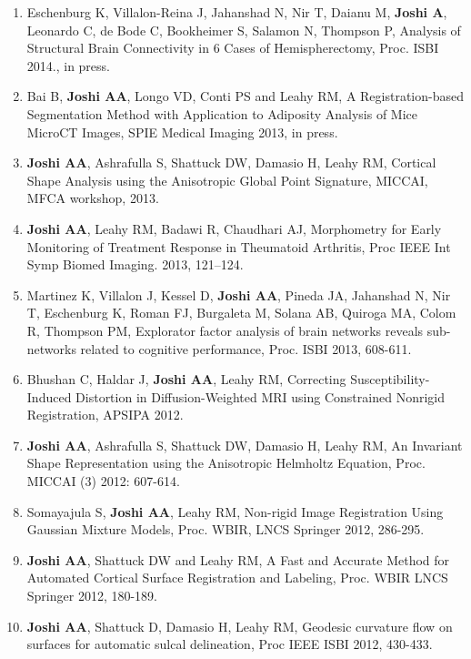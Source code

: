 \documentclass[overlapped,line,letterpaper]{res}
\begin{document}
\begin{resume}
\begin{enumerate}
    \item Eschenburg K, Villalon-Reina J, Jahanshad N, Nir T, Daianu M, \textbf{Joshi A}, Leonardo C, de Bode C, Bookheimer S, Salamon N, Thompson P, {Analysis of Structural Brain Connectivity in 6 Cases of Hemispherectomy},  Proc. ISBI 2014., in press.


    \item Bai B, \textbf{Joshi AA}, Longo VD, Conti PS and Leahy RM, {A Registration-based Segmentation Method with Application to Adiposity Analysis of Mice MicroCT Images}, SPIE Medical Imaging 2013, in press.

    \item \textbf{Joshi AA}, Ashrafulla S, Shattuck DW, Damasio H, Leahy RM, {Cortical Shape Analysis using the Anisotropic Global Point Signature}, MICCAI, MFCA workshop, 2013.
 
    \item \textbf{Joshi AA}, Leahy RM, Badawi R, Chaudhari AJ, {Morphometry for Early Monitoring of Treatment Response in Theumatoid Arthritis}, Proc IEEE Int Symp Biomed Imaging. 2013, 121–124. 

    \item Martinez K, Villalon J, Kessel D, \textbf{Joshi AA}, Pineda JA, Jahanshad N, Nir T, Eschenburg K, Roman FJ, Burgaleta M, Solana AB, Quiroga MA, Colom R, Thompson PM, {Explorator factor analysis of brain networks reveals sub-networks related to cognitive performance}, Proc. ISBI 2013, 608-611.

    \item Bhushan C, Haldar J, \textbf{Joshi AA}, Leahy RM, {Correcting Susceptibility-Induced Distortion in Diffusion-Weighted MRI using Constrained Nonrigid Registration}, APSIPA 2012. 

    \item \textbf{Joshi AA}, Ashrafulla S, Shattuck DW, Damasio H, Leahy RM, {An Invariant Shape Representation using the Anisotropic Helmholtz Equation}, Proc. MICCAI (3) 2012: 607-614.

    \item Somayajula S, \textbf{Joshi AA}, Leahy RM, {Non-rigid Image Registration Using Gaussian Mixture Models}, Proc. WBIR, LNCS Springer 2012, 286-295. 

    \item \textbf{Joshi AA}, Shattuck DW and Leahy RM, {A Fast and Accurate Method for Automated Cortical Surface Registration and Labeling}, Proc. WBIR LNCS Springer 2012, 180-189.

    \item \textbf{Joshi AA}, Shattuck D, Damasio H, Leahy RM, {Geodesic curvature flow on surfaces for automatic sulcal delineation}, Proc IEEE ISBI 2012, 430-433.


\end{enumerate}
\end{resume}
\end{document}
